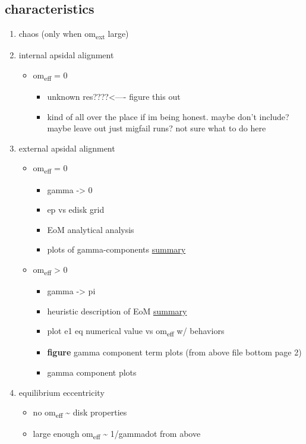 \documentclass[11pt]{article}
\begin{document}
\subsection{characteristics}
\label{sec:org23e35b5}
\begin{enumerate}
\item chaos (only when om\textsubscript{ext} large)
\item internal apsidal alignment
\begin{itemize}
\item om\textsubscript{eff} = 0
\begin{itemize}
\item unknown res????<---- figure this out
\item kind of all over the place if im being honest. maybe don't
include? maybe leave out just migfail runs? not sure what to do
here
\end{itemize}
\end{itemize}
\item external apsidal alignment
\begin{itemize}
\item om\textsubscript{eff} = 0
\begin{itemize}
\item gamma -> 0
\item ep vs edisk grid
\item EoM analytical analysis
\item plots of gamma-components
\href{file:///home/jtlaune/Dropbox/mmr/external-grid-1e-3/ext-perturber/varyomeff/gammadots-0weff/sum.pdf}{summary}
\end{itemize}
\item om\textsubscript{eff} > 0
\begin{itemize}
\item gamma -> pi
\item heuristic description of EoM
\href{file:///home/jtlaune/Dropbox/mmr/external-grid-1e-3/ext-perturber/varyomeff/sum.pdf}{summary}
\item plot e1 eq numerical value vs om\textsubscript{eff} w/ behaviors
\item \textbf{figure} gamma component term plots (from above file bottom page 2)
\item gamma component plots
\end{itemize}
\end{itemize}
\item equilibrium eccentricity
\begin{itemize}
\item no om\textsubscript{eff} \textasciitilde{} disk properties
\item large enough om\textsubscript{eff} \textasciitilde{} 1/gammadot from above
\end{itemize}
\end{enumerate}
\end{document}
